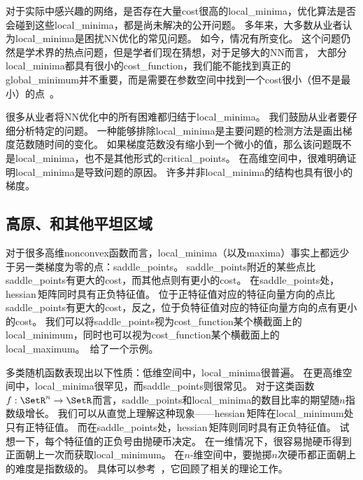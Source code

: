 对于实际中感兴趣的网络，是否存在大量\gls{cost}很高的\gls{local_minima}，优化算法是否会碰到这些\gls{local_minima}，都是尚未解决的公开问题。
多年来，大多数从业者认为\gls{local_minima}是困扰\gls{NN}优化的常见问题。
如今，情况有所变化。
这个问题仍然是学术界的热点问题，但是学者们现在猜想，对于足够大的\gls{NN}而言，
大部分\gls{local_minima}都具有很小的\gls{cost_function}，我们能不能找到真正的\gls{global_minimum}并不重要，而是需要在参数空间中找到一个\gls{cost}很小（但不是最小）的点~\citep{Saxe-et-al-2013,Dauphin-et-al-2014,Goodfellow-et-al-2015,Choromanska-et-al-2014}。

很多从业者将\gls{NN}优化中的所有困难都归结于\gls{local_minima}。
我们鼓励从业者要仔细分析特定的问题。
一种能够排除\gls{local_minima}是主要问题的检测方法是画出梯度范数随时间的变化。
如果梯度范数没有缩小到一个微小的值，那么该问题既不是\gls{local_minima}，也不是其他形式的\gls{critical_points}。
在高维空间中，很难明确证明\gls{local_minima}是导致问题的原因。
许多并非\gls{local_minima}的结构也具有很小的梯度。

\subsection{高原、和其他平坦区域}
\label{sec:plateaus_saddle_points_and_other_flat_regions}
对于很多高维\gls{nonconvex}函数而言，\gls{local_minima}（以及\gls{maxima}）事实上都远少于另一类梯度为零的点：\gls{saddle_points}。
\gls{saddle_points}附近的某些点比\gls{saddle_points}有更大的\gls{cost}，而其他点则有更小的\gls{cost}。
在\gls{saddle_points}处，\gls{hessian}\,矩阵同时具有正负特征值。
位于正特征值对应的特征向量方向的点比\gls{saddle_points}有更大的\gls{cost}，反之，位于负特征值对应的特征向量方向的点有更小的\gls{cost}。
我们可以将\gls{saddle_points}视为\gls{cost_function}某个横截面上的\gls{local_minimum}，同时也可以视为\gls{cost_function}某个横截面上的\gls{local_maximum}。
\,给了一个示例。


多类随机函数表现出以下性质：低维空间中，\gls{local_minima}很普遍。
在更高维空间中，\gls{local_minima}很罕见，而\gls{saddle_points}则很常见。
对于这类函数$f:\SetR^n \to \SetR$而言，\gls{saddle_points}和\gls{local_minima}的数目比率的期望随$n$指数级增长。
我们可以从直觉上理解这种现象——\gls{hessian}\,矩阵在\gls{local_minimum}处只有正特征值。
而在\gls{saddle_points}处，\gls{hessian}\,矩阵则同时具有正负特征值。
试想一下，每个特征值的正负号由抛硬币决定。
在一维情况下，很容易抛硬币得到正面朝上一次而获取\gls{local_minimum}。
在$n$-维空间中，要抛掷$n$次硬币都正面朝上的难度是指数级的。 
具体可以参考~\cite{Dauphin-et-al-2014}，它回顾了相关的理论工作。


